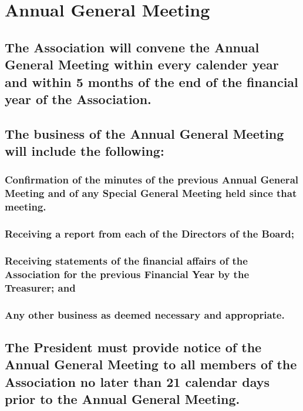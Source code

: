 \documentclass{article}
\newenvironment{subs}
  {\adjustwidth{2em}{0pt}}
  {\endadjustwidth}
\begin{document}
\section{Annual General Meeting}
\begin{subs}
\subsection{The Association will convene the Annual General Meeting within every calender year and within 5 months of the end of the financial year of the Association.}
\subsection{The business of the Annual General Meeting will include the following:}
\begin{subs}
\subsubsection{Confirmation of the minutes of the previous Annual General Meeting and of any Special General Meeting held since that meeting.}
\subsubsection{Receiving a report from each of the Directors of the Board;}
\subsubsection{Receiving statements of the financial affairs of the Association for the previous Financial Year by the Treasurer; and}
\subsubsection{Any other business as deemed necessary and appropriate.}
\end{subs}
\subsection{The President must provide notice of the Annual General Meeting to all members of the Association no later than 21 calendar days prior to the Annual General Meeting.}
\end{subs}
\newpage
\end{document}
